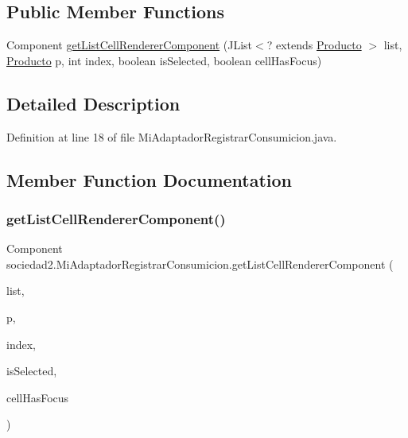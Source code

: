 \subsection*{Public Member Functions}
\begin{DoxyCompactItemize}
\item 
Component \mbox{\hyperlink{classsociedad2_1_1_mi_adaptador_registrar_consumicion_ad2e140e505196acfa5a6e53a46486387}{get\+List\+Cell\+Renderer\+Component}} (J\+List$<$? extends \mbox{\hyperlink{classsociedad2_1_1_producto}{Producto}} $>$ list, \mbox{\hyperlink{classsociedad2_1_1_producto}{Producto}} p, int index, boolean is\+Selected, boolean cell\+Has\+Focus)
\end{DoxyCompactItemize}


\subsection{Detailed Description}


Definition at line 18 of file Mi\+Adaptador\+Registrar\+Consumicion.\+java.



\subsection{Member Function Documentation}
\mbox{\label{classsociedad2_1_1_mi_adaptador_registrar_consumicion_ad2e140e505196acfa5a6e53a46486387}} 
\subsubsection{\texorpdfstring{get\+List\+Cell\+Renderer\+Component()}{getListCellRendererComponent()}}
{\footnotesize\ttfamily Component sociedad2.\+Mi\+Adaptador\+Registrar\+Consumicion.\+get\+List\+Cell\+Renderer\+Component (\begin{DoxyParamCaption}\item[{J\+List$<$? extends \mbox{\hyperlink{classsociedad2_1_1_producto}{Producto}} $>$}]{list,  }\item[{\mbox{\hyperlink{classsociedad2_1_1_producto}{Producto}}}]{p,  }\item[{int}]{index,  }\item[{boolean}]{is\+Selected,  }\item[{boolean}]{cell\+Has\+Focus }\end{DoxyParamCaption})}



